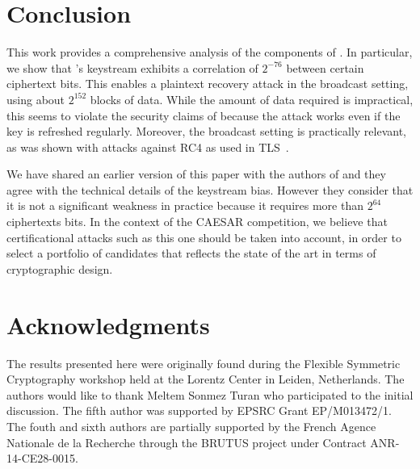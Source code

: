 
\section{Conclusion}
\label{sec/Conclusion}

This work provides a comprehensive analysis of the components of
\MORUS.  In particular, we show that \MORUS[1280]'s keystream exhibits a correlation of $2^{-76}$ between certain ciphertext bits. This enables a plaintext recovery
attack in the broadcast setting, using about $2^{152}$ blocks of data.
While the amount of data required is impractical, this seems to
violate the security claims of \MORUS[1280] because the attack works
even if the key is refreshed regularly.  Moreover, the broadcast
setting is practically relevant, as was shown with attacks against RC4
as used in TLS~\cite{DBLP:conf/uss/AlFardanBPPS13}.

We have shared an earlier version of this paper with the authors of
\MORUS and they agree with the technical details of the keystream
bias.  However they consider that it is not a significant weakness in
practice because it requires more than $2^{64}$ ciphertexts bits.  In
the context of the CAESAR competition, we believe that certificational
attacks such as this one should be taken into account, in order to
select a portfolio of candidates that reflects the state of the art in
terms of cryptographic design.

\ifanonymous
\else
\section{Acknowledgments}

The results presented here were originally found during the Flexible
Symmetric Cryptography workshop held at the Lorentz Center in Leiden,
Netherlands.  The authors would like to thank Meltem Sonmez Turan who
participated to the initial discussion.  The fifth author was
supported by EPSRC Grant EP/M013472/1.  The fouth and sixth authors
are partially supported by the French Agence Nationale de la Recherche
through the BRUTUS project under Contract ANR-14-CE28-0015.

\fi

\FloatBarrier

